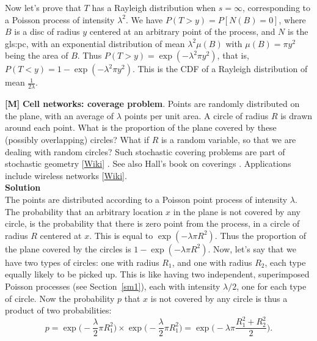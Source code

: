 \documentclass[10pt]{article}
\begin{document}
\begin{Exercise}
Now let's prove that $T$ has a Rayleigh distribution when $s=\infty$, corresponding to a Poisson process of intensity $\lambda^2$.  We have $P(T>y)=P[N(B)=0]$, where $B$ is a disc of radius $y$ centered at an arbitrary point of the process, and $N$ is the \gls{gls:pc}, with an exponential distribution of mean $\lambda^2\mu(B)$ with $\mu(B)=\pi y^2$ being the area of $B$. Thus
$P(T>y)=\exp(-\lambda^2\pi y^2)$, that is, $P(T<y)= 1 - \exp(-\lambda^2\pi y^2)$. This is the CDF of a Rayleigh distribution of mean $\frac{1}{2\lambda}$.
\end{Exercise}

\begin{Exercise}\label{exercise14c}{\bf [M]}
{\bf Cell networks: coverage problem}. Points are randomly distributed on the plane, with an average of $\lambda$ points per unit area. A circle of radius $R$ is drawn around each point. What is the proportion of the plane covered by these (possibly overlapping) circles? What if $R$ is a random variable, so that we are dealing with random circles?  Such \textcolor{index}{stochastic covering problems} are part of \textcolor{index}{stochastic geometry} [\href{https://en.wikipedia.org/wiki/Stochastic_geometry}{Wiki}] \cite{davidc,stoyan}. See also Hall's book on coverings \cite{phall}. Applications include wireless networks [\href{https://en.wikipedia.org/wiki/Stochastic_geometry_models_of_wireless_networks}{Wiki}]. \vspace{1ex} \\
{\bf Solution} \vspace{1ex}   \\
The points are distributed according to a Poisson point process of intensity $\lambda$. The probability that an arbitrary location $x$ in the plane is not covered by any circle, is the probability that there is zero point from the process, in a circle of radius $R$ centered at $x$. This is equal to $\exp(-\lambda \pi R^2)$. Thus the proportion of the plane covered by the circles is $1-\exp(-\lambda \pi R^2)$. Now, let's say that we have two types of circles: one with radius $R_1$, and one with radius $R_2$, each type equally likely to be picked up. This is like having two independent, superimposed Poisson processes (see Section~\ref{sm1}), each with intensity $\lambda/2$, one for each type of circle. Now the probability $p$ that $x$ is not covered by any circle is thus a product of two probabilities:
$$ p = \exp\Big(-\frac{\lambda}{2}\pi R_1^2\Big)\times\exp\Big(-\frac{\lambda}{2}\pi R_1^2\Big)=\exp\Big(-\lambda\pi \frac{R_1^2 + R_2^2}{2}\Big).$$

\end{Exercise}
\end{document}
